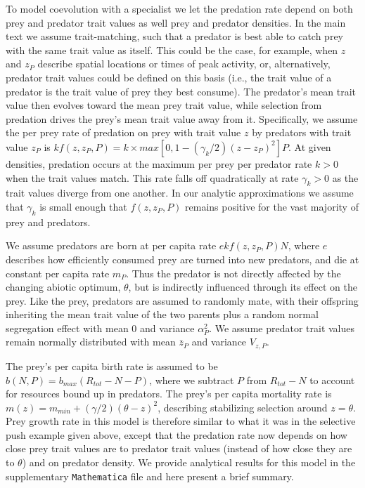 \documentclass[11pt]{article}
\begin{document}
To model coevolution with a specialist we let the predation rate depend on both prey and predator trait values as well prey and predator densities.
In the main text we assume trait-matching, such that a predator is best able to catch prey with the same trait value as itself. 
This could be the case, for example, when $z$ and $z_P$ describe spatial locations or times of peak activity, or, alternatively, predator trait values could be defined on this basis (i.e., the trait value of a predator is the trait value of prey they best consume).
The predator's mean trait value then evolves toward the mean prey trait value, while selection from predation drives the prey's mean trait value away from it.    
Specifically, we assume the per prey rate of predation on prey with trait value $z$ by predators with trait value $z_P$ is $k f(z, z_P, P) = k \times max\left[0, 1 - (\gamma_k/2) \left( z - z_P \right)^2 \right] P$.
At given densities, predation occurs at the maximum per prey per predator rate $k>0$ when the trait values match.
This rate falls off quadratically at rate $\gamma_k>0$ as the trait values diverge from one another.
In our analytic approximations we assume that $\gamma_k$ is small enough that $f(z, z_P,P)$ remains positive for the vast majority of prey and predators.

We assume predators are born at per capita rate $e k f(z, z_P,P) N$, where $e$ describes how efficiently consumed prey are turned into new predators, and die at constant per capita rate $m_P$.
Thus the predator is not directly affected by the changing abiotic optimum, $\theta$, but is indirectly influenced through its effect on the prey.
Like the prey, predators are assumed to randomly mate, with their offspring inheriting the mean trait value of the two parents plus a random normal segregation effect with mean 0 and variance $\alpha_P^2$.
We assume predator trait values remain normally distributed with mean $\bar{z}_P$ and variance $V_{z,P}$.

The prey's per capita birth rate is assumed to be $b(N,P) = b_{max} (R_{tot} - N - P)$, where we subtract $P$ from $R_{tot}-N$ to account for resources bound up in predators.
The prey's per capita mortality rate is $m(z) = m_{min} + (\gamma/2) \left( \theta - z \right)^2$, describing stabilizing selection around $z=\theta$.
Prey growth rate in this model is therefore similar to what it was in the selective push example given above, except that the predation rate now depends on how close prey trait values are to predator trait values (instead of how close they are to $\theta$) and on predator density.
We provide analytical results for this model in the supplementary \texttt{Mathematica} file and here present a brief summary.
\end{document}
